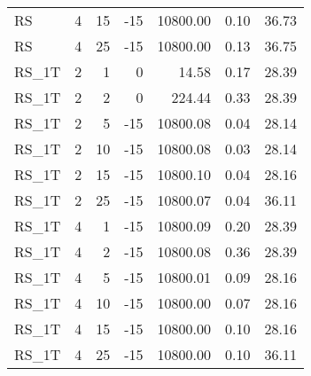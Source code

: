 \begin{center}
\begin{longtable}{lrrrrrr}
  RS     & 4 & 15 & -15 & 10800.00 & 0.10 & 36.73 \\ 
  RS     & 4 & 25 & -15 & 10800.00 & 0.13 & 36.75 \\ 
  RS\_1T     & 2 & 1 &   0 & 14.58 & 0.17 & 28.39 \\ 
  RS\_1T     & 2 & 2 &   0 & 224.44 & 0.33 & 28.39 \\ 
  RS\_1T     & 2 & 5 & -15 & 10800.08 & 0.04 & 28.14 \\ 
  RS\_1T     & 2 & 10 & -15 & 10800.08 & 0.03 & 28.14 \\ 
  RS\_1T     & 2 & 15 & -15 & 10800.10 & 0.04 & 28.16 \\ 
  RS\_1T     & 2 & 25 & -15 & 10800.07 & 0.04 & 36.11 \\ 
  RS\_1T     & 4 & 1 & -15 & 10800.09 & 0.20 & 28.39 \\ 
  RS\_1T     & 4 & 2 & -15 & 10800.08 & 0.36 & 28.39 \\ 
  RS\_1T     & 4 & 5 & -15 & 10800.01 & 0.09 & 28.16 \\ 
  RS\_1T     & 4 & 10 & -15 & 10800.00 & 0.07 & 28.16 \\ 
  RS\_1T     & 4 & 15 & -15 & 10800.00 & 0.10 & 28.16 \\ 
  RS\_1T     & 4 & 25 & -15 & 10800.00 & 0.10 & 36.11 \\ 
\end{longtable}
\end{center}
